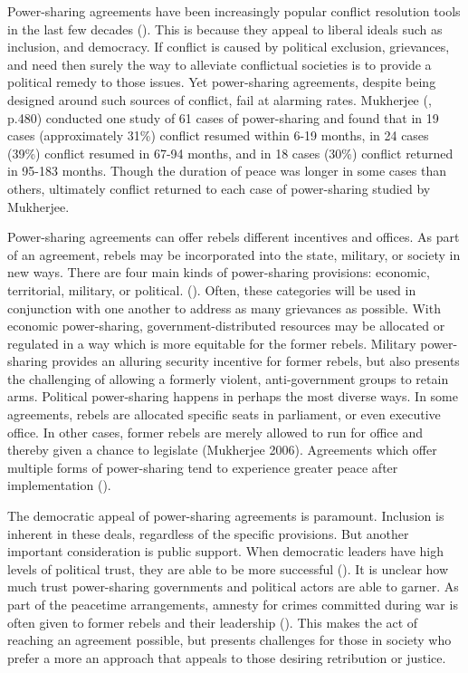 \documentclass[12pt,]{article}
\begin{document}
Power-sharing agreements have been increasingly popular conflict
resolution tools in the last few decades
(\citet{ottmann_power-sharing_201}). This is because they appeal to
liberal ideals such as inclusion, and democracy. If conflict is caused
by political exclusion, grievances, and need then surely the way to
alleviate conflictual societies is to provide a political remedy to
those issues. Yet power-sharing agreements, despite being designed
around such sources of conflict, fail at alarming rates. Mukherjee
(\citet{mukherjee_why_2006}, p.480) conducted one study of 61 cases of
power-sharing and found that in 19 cases (approximately 31\%) conflict
resumed within 6-19 months, in 24 cases (39\%) conflict resumed in 67-94
months, and in 18 cases (30\%) conflict returned in 95-183 months.
Though the duration of peace was longer in some cases than others,
ultimately conflict returned to each case of power-sharing studied by
Mukherjee.

Power-sharing agreements can offer rebels different incentives and
offices. As part of an agreement, rebels may be incorporated into the
state, military, or society in new ways. There are four main kinds of
power-sharing provisions: economic, territorial, military, or political.
(\citet{hartzell_institutionalizing_2008}). Often, these categories will
be used in conjunction with one another to address as many grievances as
possible. With economic power-sharing, government-distributed resources
may be allocated or regulated in a way which is more equitable for the
former rebels. Military power-sharing provides an alluring security
incentive for former rebels, but also presents the challenging of
allowing a formerly violent, anti-government groups to retain arms.
Political power-sharing happens in perhaps the most diverse ways. In
some agreements, rebels are allocated specific seats in parliament, or
even executive office. In other cases, former rebels are merely allowed
to run for office and thereby given a chance to legislate (Mukherjee
2006). Agreements which offer multiple forms of power-sharing tend to
experience greater peace after implementation
(\citet{hartzell_institutionalizing_2008}).

The democratic appeal of power-sharing agreements is paramount.
Inclusion is inherent in these deals, regardless of the specific
provisions. But another important consideration is public support. When
democratic leaders have high levels of political trust, they are able to
be more successful (\citet{wang_political_nodate}). It is unclear how
much trust power-sharing governments and political actors are able to
garner. As part of the peacetime arrangements, amnesty for crimes
committed during war is often given to former rebels and their
leadership (\citet{jarstad_war_2008}). This makes the act of reaching an
agreement possible, but presents challenges for those in society who
prefer a more an approach that appeals to those desiring retribution or
justice.
\end{document}
